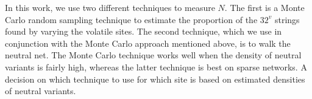 In this work, we use two different techniques to measure $N$. The
first is a Monte Carlo random sampling technique to estimate the
proportion of the $32^v$ strings found by varying the volatile sites.
The second technique, which we use in conjunction with the Monte Carlo
approach mentioned above, is to walk the neutral net. The Monte Carlo
technique works well when the density of neutral variants is fairly
high, whereas the latter technique is best on sparse networks. A decision
on which technique to use for which site is based on estimated
densities of neutral variants.


